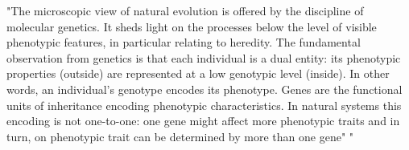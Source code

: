 
"The microscopic view of natural evolution is offered by the discipline of molecular genetics. It sheds light on the processes below the level of visible phenotypic features, in particular relating to heredity. The fundamental observation from genetics is that each individual is a dual entity: its phenotypic properties (outside) are represented at a low genotypic level (inside). In other words, an individual's genotype encodes its phenotype. Genes are the functional units of inheritance encoding phenotypic characteristics. In natural systems this encoding is not one-to-one: one gene might affect more phenotypic traits and in turn, on phenotypic trait can be determined by more than one gene" \cite{EibenSmith2003}"

